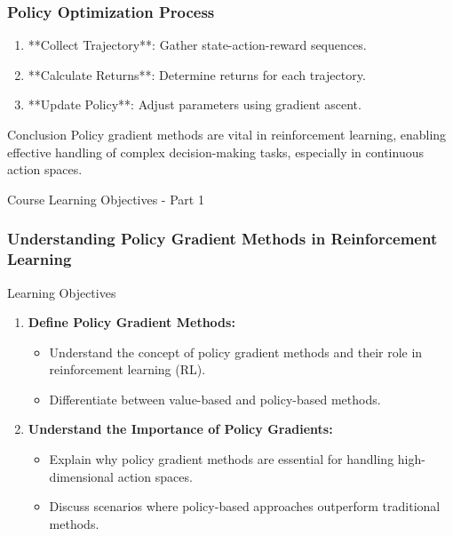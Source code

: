 \documentclass[aspectratio=169]{beamer}
\begin{document}
\begin{frame}[fragile]
    \frametitle{Policy Optimization Process}
    \begin{enumerate}
        \item **Collect Trajectory**: Gather state-action-reward sequences.
        \item **Calculate Returns**: Determine returns for each trajectory.
        \item **Update Policy**: Adjust parameters using gradient ascent.
    \end{enumerate}
    
    \begin{block}{Conclusion}
        Policy gradient methods are vital in reinforcement learning, enabling effective handling of complex decision-making tasks, especially in continuous action spaces.
    \end{block}
\end{frame}

\begin{frame}[fragile]{Course Learning Objectives - Part 1}
    \frametitle{Understanding Policy Gradient Methods in Reinforcement Learning}
    
    \begin{block}{Learning Objectives}
        \begin{enumerate}
            \item \textbf{Define Policy Gradient Methods:}
            \begin{itemize}
                \item Understand the concept of policy gradient methods and their role in reinforcement learning (RL).
                \item Differentiate between value-based and policy-based methods.
            \end{itemize}
            \item \textbf{Understand the Importance of Policy Gradients:}
            \begin{itemize}
                \item Explain why policy gradient methods are essential for handling high-dimensional action spaces.
                \item Discuss scenarios where policy-based approaches outperform traditional methods.
            \end{itemize}
        \end{enumerate}
    \end{block}
    
\end{frame}
\end{document}
